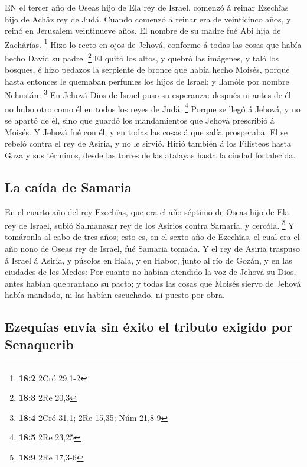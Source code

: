 EN el tercer año de Oseas hijo de Ela rey de Israel,
comenzó á reinar Ezechîas hijo de Achâz rey de Judá.  Cuando
comenzó á reinar era de veinticinco años, y reinó en Jerusalem
veintinueve años. El nombre de su madre fué Abi hija de Zachârías.
\footnote{\textbf{18:2} 2Cró 29,1-2}  Hizo lo recto en ojos
de Jehová, conforme á todas las cosas que había hecho David su padre.
\footnote{\textbf{18:3} 2Re 20,3}  El quitó los altos, y
quebró las imágenes, y taló los bosques, é hizo pedazos la serpiente de
bronce que había hecho Moisés, porque hasta entonces le quemaban
perfumes los hijos de Israel; y llamóle por nombre Nehustán. \footnote{\textbf{18:4}
  2Cró 31,1; 2Re 15,35; Núm 21,8-9}  En Jehová Dios de
Israel puso su esperanza: después ni antes de él no hubo otro como él en
todos los reyes de Judá. \footnote{\textbf{18:5} 2Re 23,25} 
Porque se llegó á Jehová, y no se apartó de él, sino que guardó los
mandamientos que Jehová prescribió á Moisés.  Y Jehová fué
con él; y en todas las cosas á que salía prosperaba. El se rebeló contra
el rey de Asiria, y no le sirvió.  Hirió también á los
Filisteos hasta Gaza y sus términos, desde las torres de las atalayas
hasta la ciudad fortalecida.

\hypertarget{la-cauxedda-de-samaria}{%
\subsection{La caída de Samaria}\label{la-cauxedda-de-samaria}}

 En el cuarto año del rey Ezechîas, que era el año séptimo
de Oseas hijo de Ela rey de Israel, subió Salmanasar rey de los Asirios
contra Samaria, y cercóla. \footnote{\textbf{18:9} 2Re 17,3-6}
 Y tomáronla al cabo de tres años; esto es, en el sexto año
de Ezechîas, el cual era el año nono de Oseas rey de Israel, fué Samaria
tomada.  Y el rey de Asiria traspuso á Israel á Asiria, y
púsolos en Hala, y en Habor, junto al río de Gozán, y en las ciudades de
los Medos:  Por cuanto no habían atendido la voz de Jehová
su Dios, antes habían quebrantado su pacto; y todas las cosas que Moisés
siervo de Jehová había mandado, ni las habían escuchado, ni puesto por
obra.

\hypertarget{ezequuxedas-envuxeda-sin-uxe9xito-el-tributo-exigido-por-senaquerib}{%
\subsection{Ezequías envía sin éxito el tributo exigido por
Senaquerib}\label{ezequuxedas-envuxeda-sin-uxe9xito-el-tributo-exigido-por-senaquerib}}

